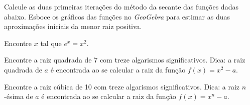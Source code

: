 \begin{question}
Calcule as duas primeiras iterações do método da secante das funções dadas abaixo. Esboce os gráficos das funções no \emph{GeoGebra} para estimar as duas aproximações iniciais da menor raiz positiva.
\end{question}

\begin{question}
Encontre $x$ tal que $e^x=x^2$.
\end{question}

\begin{question}
Encontre a raiz quadrada de 7 com treze algarismos significativos. Dica: a raiz quadrada de $a$ é encontrada ao se calcular a raiz da função $f(x)=x^2-a$.
\end{question}

\begin{question}
Encontre a raiz cúbica de 10 com treze algarismos significativos. Dica: a raiz $n$-ésima de $a$ é encontrada ao se calcular a raiz da função $f(x)=x^n-a$.
\end{question}


